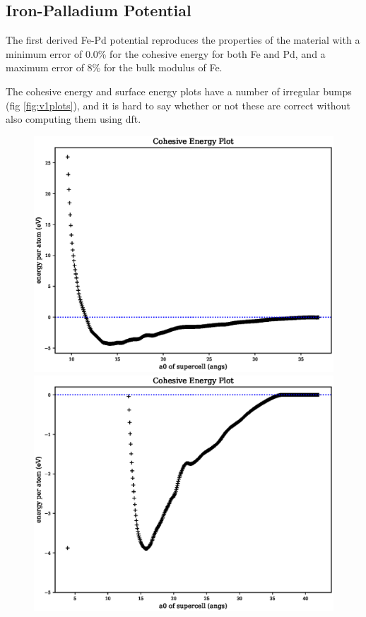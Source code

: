 \subsection{Iron-Palladium Potential}

The first derived Fe-Pd potential reproduces the properties of the material with a minimum error of 0.0\% for the cohesive energy for both Fe and Pd, and a maximum error of 8\% for the bulk modulus of Fe.

The cohesive energy and surface energy plots have a number of irregular bumps (fig \ref{fig:v1plots}), and it is hard to say whether or not these are correct without also computing them using \acrshort{dft}.

\begin{figure}[ht] 
  \centering
  \begin{minipage}[b]{0.4\linewidth}
    \centering
    \includegraphics[width=.98\linewidth]{chapters/results_potential_fitting/pot_fepd_fcc_1/fe_cohesive_energy.eps} 
  \end{minipage}%
  \begin{minipage}[b]{0.4\linewidth}
    \centering
    \includegraphics[width=.98\linewidth]{chapters/results_potential_fitting/pot_fepd_fcc_1/pd_cohesive_energy_zoom.eps} 
  \end{minipage}%


\end{figure}
